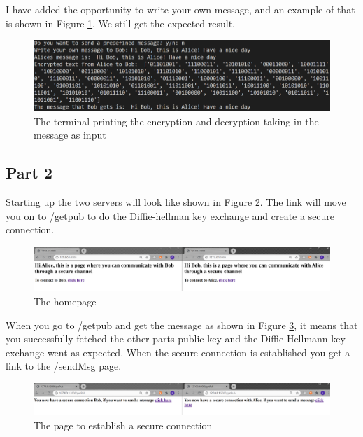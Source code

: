 \documentclass[12pt, letterpaper]{article}
\begin{document}
I have added the opportunity to write your own message, and an example of that is shown in Figure \ref{fig:runN}. We still get the expected result.

\begin{figure}[H]
  \includegraphics[width=\linewidth]{code_snippets/runN.PNG}
  \caption{The terminal printing the encryption and decryption taking in the message as input}
  \label{fig:runN}
\end{figure}


\subsection*{Part 2}
Starting up the two servers will look like shown in Figure \ref{fig:front}. The link will move you on to /getpub to do the Diffie-hellman key exchange and create a secure connection.

\begin{figure}[H]
  \hspace*{-50px}\includegraphics[width=500px]{code_snippets/front.PNG}
  \caption{The homepage}
  \label{fig:front}
\end{figure}

When you go to /getpub and get the message as shown in Figure \ref{fig:getpubpage}, it means that you successfully fetched the other parts public key and the Diffie-Hellmann key exchange went as expected. When the secure connection is established you get a link to the /sendMsg page.

\begin{figure}[H]
  \hspace*{-50px}\includegraphics[width=500px]{code_snippets/getpubpage.PNG}
  \caption{The page to establish a secure connection}
  \label{fig:getpubpage}
\end{figure}
\end{document}
